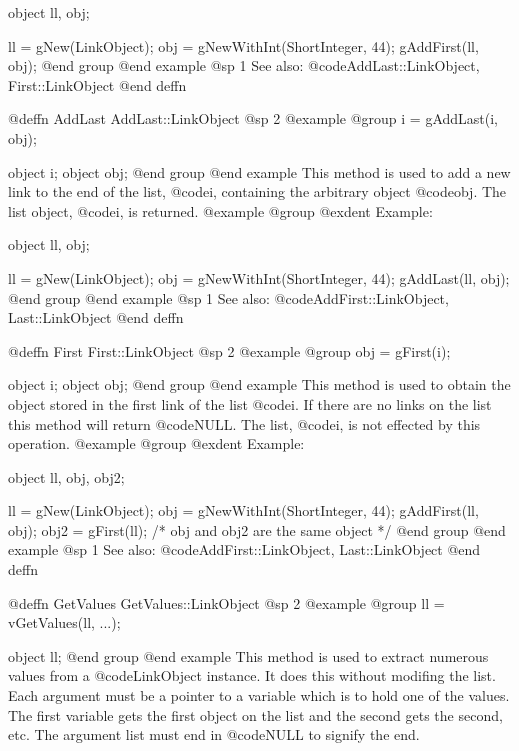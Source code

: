 object  ll, obj;

ll = gNew(LinkObject);
obj = gNewWithInt(ShortInteger, 44);
gAddFirst(ll, obj);
@end group
@end example
@sp 1
See also:  @code{AddLast::LinkObject, First::LinkObject}
@end deffn







@deffn {AddLast} AddLast::LinkObject
@sp 2
@example
@group
i = gAddLast(i, obj);

object  i;
object  obj;
@end group
@end example
This method is used to add a new link to the end of the list,
@code{i}, containing the arbitrary object @code{obj}.  The list object,
@code{i}, is returned.
@example
@group
@exdent Example:

object  ll, obj;

ll = gNew(LinkObject);
obj = gNewWithInt(ShortInteger, 44);
gAddLast(ll, obj);
@end group
@end example
@sp 1
See also:  @code{AddFirst::LinkObject, Last::LinkObject}
@end deffn











@deffn {First} First::LinkObject
@sp 2
@example
@group
obj = gFirst(i);

object  i;
object  obj;
@end group
@end example
This method is used to obtain the object stored in the first link of the
list @code{i}.  If there are no links on the list this method will
return @code{NULL}.  The list, @code{i}, is not effected by this operation.
@example
@group
@exdent Example:

object  ll, obj, obj2;

ll = gNew(LinkObject);
obj = gNewWithInt(ShortInteger, 44);
gAddFirst(ll, obj);
obj2 = gFirst(ll);
/* obj and obj2 are the same object  */
@end group
@end example
@sp 1
See also:  @code{AddFirst::LinkObject, Last::LinkObject}
@end deffn













@deffn {GetValues} GetValues::LinkObject
@sp 2
@example
@group
ll = vGetValues(ll, ...);

object  ll;
@end group
@end example
This method is used to extract numerous values from a @code{LinkObject} instance.
It does this without modifing the list.  Each argument must be a pointer to a
variable which is to hold one of the values.  The first variable gets the first
object on the list and the second gets the second, etc.  The argument list must
end in @code{NULL} to signify the end.

